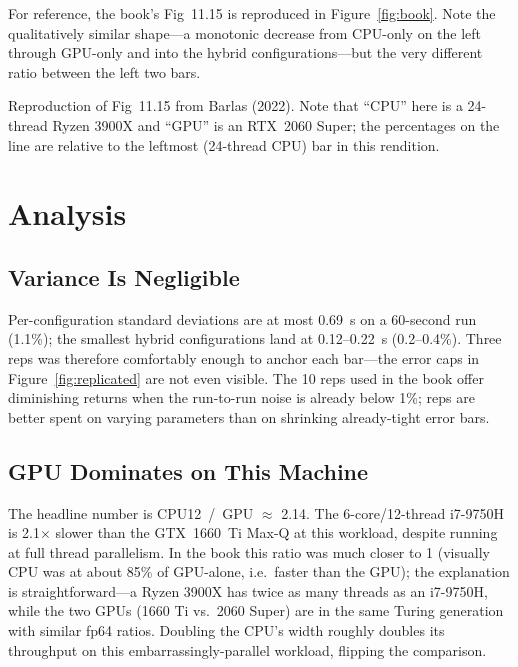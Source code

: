 \documentclass[
	english,
	letterpaper, oneside
]{article}
\begin{document}
For reference, the book's Fig~11.15 is reproduced in
Figure~\ref{fig:book}. Note the qualitatively similar shape---a
monotonic decrease from CPU-only on the left through GPU-only and into
the hybrid configurations---but the very different ratio between the
left two bars.

            {Reproduction of Fig~11.15 from Barlas (2022).  Note that
             ``CPU'' here is a 24-thread Ryzen 3900X and ``GPU'' is an
             RTX~2060 Super; the percentages on the line are relative
             to the leftmost (24-thread CPU) bar in this rendition.
             \label{fig:book}}

\section{Analysis}

\subsection{Variance Is Negligible}

Per-configuration standard deviations are at most 0.69~s on a 60-second
run (1.1\%); the smallest hybrid configurations land at 0.12--0.22~s
(0.2--0.4\%). Three reps was therefore comfortably enough to anchor
each bar---the error caps in Figure~\ref{fig:replicated} are not even
visible. The 10 reps used in the book offer diminishing returns when
the run-to-run noise is already below 1\%; reps are better spent on
varying parameters than on shrinking already-tight error bars.

\subsection{GPU Dominates on This Machine}

The headline number is CPU12~/~GPU $\approx$ 2.14. The 6-core/12-thread
i7-9750H is 2.1$\times$ slower than the GTX~1660~Ti Max-Q at this
workload, despite running at full thread parallelism. In the book this
ratio was much closer to 1 (visually CPU was at about 85\% of
GPU-alone, i.e.\ faster than the GPU); the explanation is
straightforward---a Ryzen 3900X has twice as many threads as an
i7-9750H, while the two GPUs (1660 Ti vs.\ 2060 Super) are in the same
Turing generation with similar fp64 ratios. Doubling the CPU's width
roughly doubles its throughput on this embarrassingly-parallel workload,
flipping the comparison.
\end{document}
